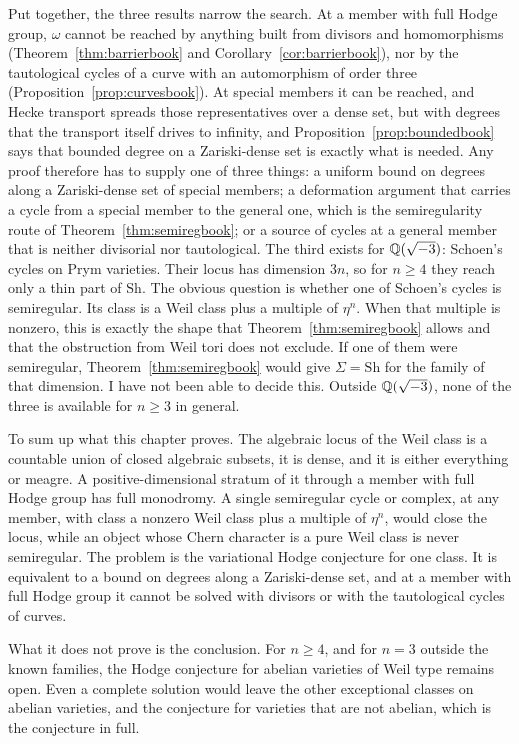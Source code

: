 Put together, the three results narrow the search. At a member with full
Hodge group, $\omega$ cannot be reached by anything built from divisors and
homomorphisms (Theorem~\ref{thm:barrierbook} and
Corollary~\ref{cor:barrierbook}), nor by the tautological cycles of a curve
with an automorphism of order three (Proposition~\ref{prop:curvesbook}). At
special members it can be reached, and Hecke transport spreads those
representatives over a dense set, but with degrees that the transport
itself drives to infinity, and Proposition~\ref{prop:boundedbook} says that
bounded degree on a Zariski-dense set is exactly what is needed. Any proof
therefore has to supply one of three things: a uniform bound on degrees
along a Zariski-dense set of special members; a deformation argument that
carries a cycle from a special member to the general one, which is the
semiregularity route of Theorem~\ref{thm:semiregbook}; or a source of cycles at
a general member that is neither divisorial nor tautological. The third
exists for $\mathbb{Q}(\sqrt{-3})$: Schoen's cycles on Prym varieties. Their
locus has dimension $3n$, so for $n\ge4$ they reach only a thin part of
$\mathrm{Sh}$. The obvious question is whether one of Schoen's cycles is
semiregular. Its class is a Weil class plus a multiple of $\eta^{n}$. When
that multiple is nonzero, this is exactly the shape that Theorem~\ref{thm:semiregbook}
allows and that the obstruction from Weil tori does not exclude. If one of them were
semiregular, Theorem~\ref{thm:semiregbook} would give $\Sigma=\mathrm{Sh}$ for the
family of that dimension. I have not been able to decide this. Outside
$\mathbb{Q}(\sqrt{-3})$, none of the three is available for $n\ge3$ in general.

To sum up what this chapter proves. The algebraic locus of the Weil class
is a countable union of closed algebraic subsets, it is dense, and it is
either everything or meagre. A positive-dimensional stratum of it through
a member with full Hodge group has full monodromy. A single semiregular
cycle or complex, at any member, with class a nonzero Weil class plus a
multiple of $\eta^{n}$, would close the locus, while an object whose Chern
character is a pure Weil class is never semiregular. The problem is the
variational Hodge conjecture for one class. It is equivalent to a bound on
degrees along a Zariski-dense set, and at a member with full Hodge group it
cannot be solved with divisors or with the tautological cycles of curves.

What it does not prove is the conclusion. For $n\ge4$, and for $n=3$
outside the known families, the Hodge conjecture for abelian varieties of
Weil type remains open. Even a complete solution would leave the other
exceptional classes on abelian varieties, and the conjecture for varieties
that are not abelian, which is the conjecture in full.
